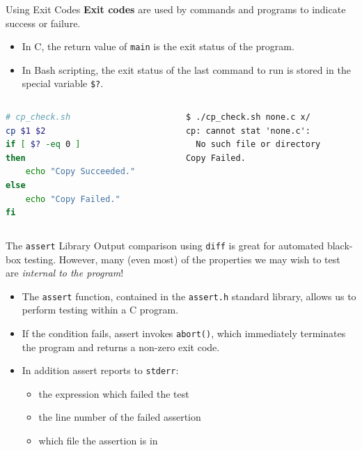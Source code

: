\documentclass[11pt]{beamer}
\begin{document}
\begin{frame}[fragile=singleslide]{Using Exit Codes}
\textbf{Exit codes} are used by commands and programs to indicate success or failure.  
\begin{itemize}
\item In C, the return value of \texttt{main} is the exit status of the program.  
\item In Bash scripting, the exit status of the last command to run is stored in the special variable \texttt{\$?}.
\end{itemize}

\begin{columns}
\begin{column}{0.5\textwidth}
\begin{lstlisting}[style=terminal, language=bash]
# cp_check.sh
cp $1 $2
if [ $? -eq 0 ]
then
	echo "Copy Succeeded."
else 
	echo "Copy Failed."
fi
\end{lstlisting}
\end{column}
\begin{column}{0.5\textwidth}
\begin{lstlisting}[style=terminal] 
$ ./cp_check.sh none.c x/
cp: cannot stat 'none.c': 
  No such file or directory
Copy Failed.
\end{lstlisting}
\vspace{4em}
\end{column}
\end{columns}
\end{frame}

\begin{frame}[fragile=singleslide]{The \texttt{assert} Library}
Output comparison using \texttt{diff} is great for automated black-box testing.  However, many (even most) of the properties we may wish to test are \emph{internal to the program}!  
\begin{itemize}
\item The \texttt{assert} function, contained in the \texttt{assert.h} standard library, allows us to perform testing within a C program.
\item If the condition fails, assert invokes \texttt{abort()}, which immediately terminates the program and returns a non-zero exit code.
\item In addition assert reports to \texttt{stderr}:
\begin{itemize}
 \item the expression which failed the test
 \item the line number of the failed assertion
 \item which file the assertion is in
 \end{itemize} 
\end{itemize}
\end{frame}
\end{document}
